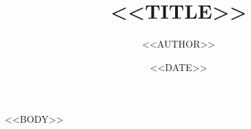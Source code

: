 \documentclass[UTF8,a4paper,12pt]{ctexart}
\title{<<TITLE>>}
\author{<<AUTHOR>>}
\date{<<DATE>>}
\begin{document}
\maketitle

<<BODY>>
\end{document}

